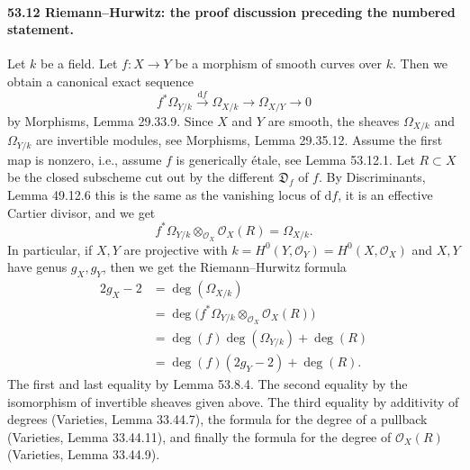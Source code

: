 
\paragraph{53.12 Riemann--Hurwitz: the proof discussion preceding the numbered statement.}
Let $k$ be a field. Let $f:X\to Y$ be a morphism of smooth curves over $k$. Then we obtain a canonical exact sequence
\[f^*\Omega_{Y/k}\xrightarrow{\mathrm df}\Omega_{X/k}\longrightarrow\Omega_{X/Y}\longrightarrow0\]
by Morphisms, Lemma 29.33.9. Since $X$ and $Y$ are smooth, the sheaves $\Omega_{X/k}$ and $\Omega_{Y/k}$ are invertible modules, see Morphisms, Lemma 29.35.12. Assume the first map is nonzero, i.e., assume $f$ is generically \'etale, see Lemma 53.12.1. Let $R\subset X$ be the closed subscheme cut out by the different $\mathfrak D_f$ of $f$. By Discriminants, Lemma 49.12.6 this is the same as the vanishing locus of $\mathrm df$, it is an effective Cartier divisor, and we get
\[f^*\Omega_{Y/k}\otimes_{\mathcal O_X}\mathcal O_X(R)=\Omega_{X/k}.\]
In particular, if $X,Y$ are projective with $k=H^0(Y,\mathcal O_Y)=H^0(X,\mathcal O_X)$ and $X,Y$ have genus $g_X,g_Y$, then we get the Riemann--Hurwitz formula
\begin{align*}
2g_X-2&=\deg(\Omega_{X/k})\\
&=\deg\bigl(f^*\Omega_{Y/k}\otimes_{\mathcal O_X}\mathcal O_X(R)\bigr)\\
&=\deg(f)\deg(\Omega_{Y/k})+\deg(R)\\
&=\deg(f)(2g_Y-2)+\deg(R).
\end{align*}
The first and last equality by Lemma 53.8.4. The second equality by the isomorphism of invertible sheaves given above. The third equality by additivity of degrees (Varieties, Lemma 33.44.7), the formula for the degree of a pullback (Varieties, Lemma 33.44.11), and finally the formula for the degree of $\mathcal O_X(R)$ (Varieties, Lemma 33.44.9).

